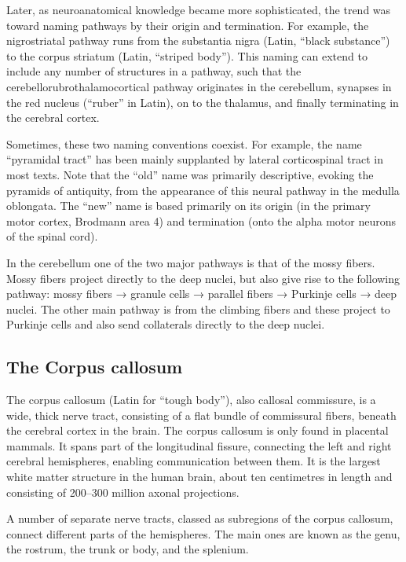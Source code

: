 Later, as neuroanatomical knowledge became more sophisticated, the trend was toward naming pathways by their origin and termination. For example, the nigrostriatal pathway runs from the substantia nigra (Latin, ``black substance'') to the corpus striatum (Latin, ``striped body''). This naming can extend to include any number of structures in a pathway, such that the cerebellorubrothalamocortical pathway originates in the cerebellum, synapses in the red nucleus (``ruber'' in Latin), on to the thalamus, and finally terminating in the cerebral cortex.

Sometimes, these two naming conventions coexist. For example, the name ``pyramidal tract'' has been mainly supplanted by lateral corticospinal tract in most texts. Note that the ``old'' name was primarily descriptive, evoking the pyramids of antiquity, from the appearance of this neural pathway in the medulla oblongata. The ``new'' name is based primarily on its origin (in the primary motor cortex, Brodmann area 4) and termination (onto the alpha motor neurons of the spinal cord).

In the cerebellum one of the two major pathways is that of the mossy fibers. Mossy fibers project directly to the deep nuclei, but also give rise to the following pathway: mossy fibers → granule cells → parallel fibers → Purkinje cells → deep nuclei. The other main pathway is from the climbing fibers and these project to Purkinje cells and also send collaterals directly to the deep nuclei.

\hypertarget{the-corpus-callosum}{%
\subsection{The Corpus callosum}\label{the-corpus-callosum}}

The corpus callosum (Latin for ``tough body''), also callosal commissure, is a wide, thick nerve tract, consisting of a flat bundle of commissural fibers, beneath the cerebral cortex in the brain. The corpus callosum is only found in placental mammals. It spans part of the longitudinal fissure, connecting the left and right cerebral hemispheres, enabling communication between them. It is the largest white matter structure in the human brain, about ten centimetres in length and consisting of 200--300 million axonal projections.

A number of separate nerve tracts, classed as subregions of the corpus callosum, connect different parts of the hemispheres. The main ones are known as the genu, the rostrum, the trunk or body, and the splenium.

